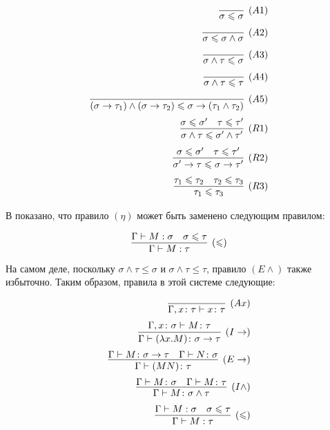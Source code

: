 \documentclass[../main.tex]{subfiles}
\begin{document}
\begin{equation} \label{rules leq}
\begin{aligned}
\infer[(A1)]{\sigma \leqslant \sigma}{} \\[2pt]
\infer[(A2)]{\sigma \leqslant \sigma \wedge \sigma}{} \\[2pt]
\infer[(A3)]{\sigma \wedge \tau \leqslant \sigma}{} \\[2pt]
\infer[(A4)]{\sigma \wedge \tau \leqslant \tau}{} \\[2pt]
\infer[(A5)]{(\sigma \to \tau_1) \wedge (\sigma \to \tau_2) \leqslant \sigma \to (\tau_1 \wedge \tau_2)}{} \\[2pt]
\infer[(R1)]{\sigma \wedge \tau \leqslant \sigma' \wedge \tau'}{\sigma \leqslant \sigma' & \tau \leqslant \tau'} \\[2pt]
\infer[(R2)]{\sigma' \to \tau \leqslant \sigma \to \tau'}{\sigma \leqslant \sigma' & \tau \leqslant \tau'} \\[2pt]
\infer[(R3)]{\tau_1 \leqslant \tau_3}{\tau_1 \leqslant \tau_2 & \tau_2 \leqslant \tau_3} 
\end{aligned}
\end{equation}


В \cite{hindley_1992} показано, что правило $(\eta)$ может быть заменено следующим правилом:

$$\infer[(\leqslant)]{\Gamma \vdash M : \tau}{\Gamma \vdash M : \sigma & \sigma \leqslant \tau}$$

На самом деле, поскольку $\sigma \wedge \tau \leqslant \sigma$ и $\sigma \wedge \tau \leqslant \tau$, правило $(E \wedge)$ также избыточно. Таким образом, правила в этой системе следующие: 

\begin{equation} \label{rules subtype}
\begin{aligned}
\infer[(Ax)]{\Gamma, x \colon \tau \vdash x \colon \tau}{}\\[2pt]
\infer[(I\to)]{\Gamma \vdash (\lambda x . M) \colon \sigma \to \tau}{\Gamma, x \colon \sigma \vdash M \colon \tau}\\[2pt]
\infer[(E\to)]{\Gamma \vdash (MN) \colon \tau}{\Gamma \vdash M \colon \sigma \to \tau & \Gamma \vdash N \colon \sigma}\\[2pt]
\infer[(I\wedge)]{\Gamma \vdash M \colon \sigma \wedge \tau}{\Gamma \vdash M \colon \sigma & \Gamma \vdash M \colon \tau}\\[2pt]
\infer[(\leqslant)]{\Gamma \vdash M : \tau}{\Gamma \vdash M : \sigma & \sigma \leqslant \tau}

\end{aligned}
\end{equation}
\end{document}
